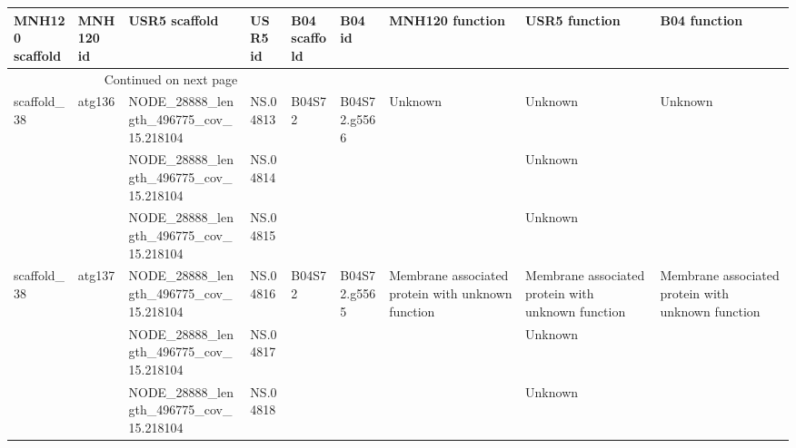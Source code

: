 \begin{longtable}{lllllllll}
\toprule
MNH120 scaffold & MNH120 id &                           USR5 scaffold &               USR5 id & B04 scaffold &         B04 id &                                    MNH120 function &                                      USR5 function &                                       B04 function \\
\midrule
\endhead
\midrule
\multicolumn{3}{r}{{Continued on next page}} \\
\midrule
\endfoot

\bottomrule
\endlastfoot
    scaffold\_38 &    atg136 &  NODE\_28888\_length\_496775\_cov\_15.218104 &              NS.04813 &       B04S72 &   B04S72.g5566 &                                            Unknown &                                            Unknown &                                            Unknown \\
                &           &  NODE\_28888\_length\_496775\_cov\_15.218104 &              NS.04814 &              &                &                                                    &                                            Unknown &                                                    \\
                &           &  NODE\_28888\_length\_496775\_cov\_15.218104 &              NS.04815 &              &                &                                                    &                                            Unknown &                                                    \\
    scaffold\_38 &    atg137 &  NODE\_28888\_length\_496775\_cov\_15.218104 &              NS.04816 &       B04S72 &   B04S72.g5565 &  Membrane associated protein with unknown function &  Membrane associated protein with unknown function &  Membrane associated protein with unknown function \\
                &           &  NODE\_28888\_length\_496775\_cov\_15.218104 &              NS.04817 &              &                &                                                    &                                            Unknown &                                                    \\
                &           &  NODE\_28888\_length\_496775\_cov\_15.218104 &              NS.04818 &              &                &                                                    &                                            Unknown &                                                    \\

\end{longtable}
